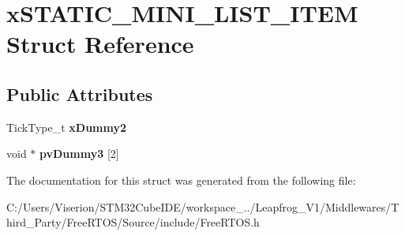 \hypertarget{structx_s_t_a_t_i_c___m_i_n_i___l_i_s_t___i_t_e_m}{}\section{x\+S\+T\+A\+T\+I\+C\+\_\+\+M\+I\+N\+I\+\_\+\+L\+I\+S\+T\+\_\+\+I\+T\+EM Struct Reference}
\label{structx_s_t_a_t_i_c___m_i_n_i___l_i_s_t___i_t_e_m}
\subsection*{Public Attributes}
\begin{DoxyCompactItemize}
\item 
\mbox{\label{structx_s_t_a_t_i_c___m_i_n_i___l_i_s_t___i_t_e_m_a0cbe65e7e550dc4bca38579ccac6c512}} 
Tick\+Type\+\_\+t {\bfseries x\+Dummy2}
\item 
\mbox{\label{structx_s_t_a_t_i_c___m_i_n_i___l_i_s_t___i_t_e_m_a212bc2495f1e3a225f50d3311ce00cb9}} 
void $\ast$ {\bfseries pv\+Dummy3} \mbox{[}2\mbox{]}
\end{DoxyCompactItemize}


The documentation for this struct was generated from the following file\+:\begin{DoxyCompactItemize}
\item 
C\+:/\+Users/\+Viserion/\+S\+T\+M32\+Cube\+I\+D\+E/workspace\+\_../\+Leapfrog\+\_\+\+V1/\+Middlewares/\+Third\+\_\+\+Party/\+Free\+R\+T\+O\+S/\+Source/include/Free\+R\+T\+O\+S.\+h\end{DoxyCompactItemize}
